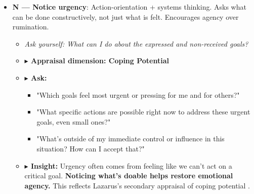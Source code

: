 \documentclass{article}
\begin{document}
\begin{itemize}[noitemsep,topsep=0pt]
    \item \textbf{N — Notice urgency}: Action-orientation + systems thinking. Asks what can be done constructively, not just what is felt. Encourages agency over rumination.
    \begin{itemize}[noitemsep,topsep=0pt]
        \item \textit{Ask yourself: What can I do about the expressed and non-received goals?}
        \item \textbf{$\blacktriangleright$ Appraisal dimension: Coping Potential}
        \item \textbf{$\blacktriangleright$ Ask:}
        \begin{itemize}[noitemsep,topsep=0pt]
            \item "Which goals feel most urgent or pressing for me and for others?"
            \item "What specific actions are possible right now to address these urgent goals, even small ones?"
            \item "What's outside of my immediate control or influence in this situation? How can I accept that?"
        \end{itemize}
        \item \textbf{$\blacktriangleright$ Insight:} Urgency often comes from feeling like we can't act on a critical goal. \textbf{Noticing what's doable helps restore emotional agency.} This reflects Lazarus's secondary appraisal of coping potential \cite{lazarus1984stress}.
    \end{itemize}


\end{itemize}
\end{document}
